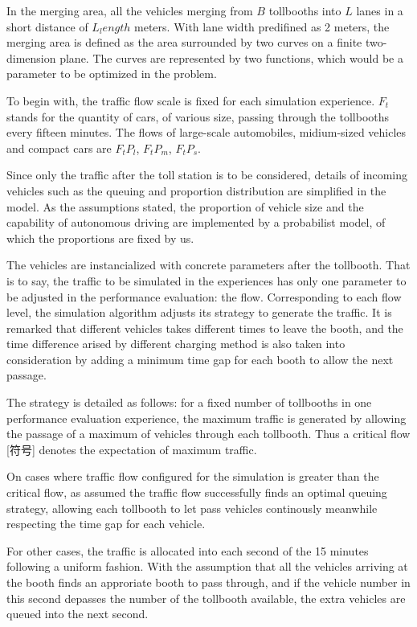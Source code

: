 \documentclass{mcmthesis}
\begin{document}
In the merging area, all the vehicles merging from $B$ tollbooths into $L$ lanes in a short distance of $L_length$ meters.
With lane width predifined as 2 meters, the merging area is defined as the area surrounded by two curves on a finite two-dimension plane. The curves are represented by two functions, which would be a parameter to be optimized in the problem.

To begin with, the traffic flow scale is fixed for each simulation experience. $F_t$ stands for the quantity of cars, of various size, passing through the tollbooths every fifteen minutes. The flows of large-scale automobiles, midium-sized vehicles and compact cars are $F_tP_l$, $F_tP_m$, $F_tP_s$.

Since only the traffic after the toll station is to be considered, details of incoming vehicles such as the queuing and proportion distribution are simplified in the model. As the assumptions stated, the proportion of vehicle size and the capability of autonomous driving are implemented by a probabilist model, of which the proportions are fixed by us. 

The vehicles are instancialized with concrete parameters after the tollbooth. That is to say, the traffic to be simulated in the experiences has only one parameter to be adjusted in the performance evaluation: the flow. Corresponding to each flow level, the simulation algorithm adjusts its strategy to generate the traffic. It is remarked that different vehicles takes different times to leave the booth, and the time difference arised by different charging method is also taken into consideration by adding a minimum time gap for each booth to allow the next passage.

The strategy is detailed as follows: for a fixed number of tollbooths in one performance evaluation experience, the maximum traffic is generated by allowing the passage of a maximum of vehicles through each tollbooth. Thus a critical flow [符号] denotes the expectation of maximum traffic. 

On cases where traffic flow configured for the simulation is greater than the critical flow, as assumed the traffic flow successfully finds an optimal queuing strategy, allowing each tollbooth to let pass vehicles continously meanwhile respecting the time gap for each vehicle. 

For other cases, the traffic is allocated into each second of the 15 minutes following a uniform fashion. With the assumption that all the vehicles arriving at the booth finds an approriate booth to pass through, and if the vehicle number in this second depasses the number of the tollbooth available, the extra vehicles are queued into the next second.
\end{document}
